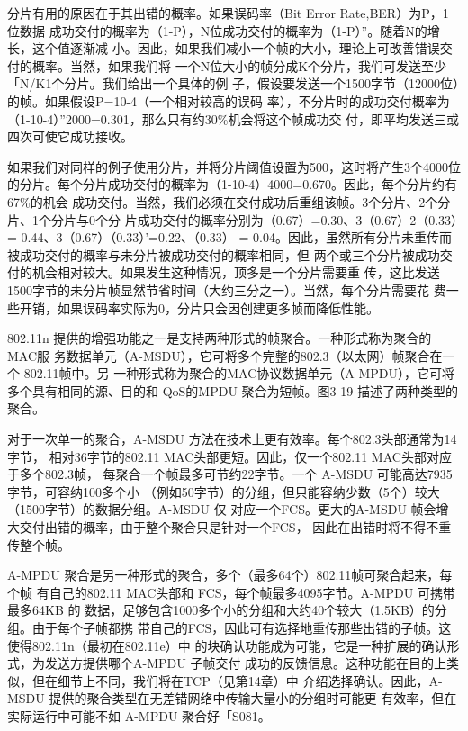 分片有用的原因在于其出错的概率。如果误码率（Bit Error Rate,BER）为P，1 位数据
成功交付的概率为（1-P），N位成功交付的概率为（1-P）”。随着N的增长，这个值逐渐减
小。因此，如果我们减小一个帧的大小，理论上可改善错误交付的概率。当然，如果我们将
一个N位大小的帧分成K个分片，我们可发送至少「N/K1个分片。我们给出一个具体的例
子，假设要发送一个1500字节（12000位）的帧。如果假设P=10-4（一个相对较高的误码
率），不分片时的成功交付概率为（1-10-4）”2000=0.301，那么只有约30\%机会将这个帧成功交
付，即平均发送三或四次可使它成功接收。

如果我们对同样的例子使用分片，并将分片阈值设置为500，这时将产生3个4000位
的分片。每个分片成功交付的概率为（1-10-4）4000=0.670。因此，每个分片约有67\%的机会
成功交付。当然，我们必须在交付成功后重组该帧。3个分片、2个分片、1个分片与0个分
片成功交付的概率分别为（0.67）=0.30、3（0.67）2（0.33）= 0.44、3（0.67）（0.33）’=0.22、（0.33） =
0.04。因此，虽然所有分片未重传而被成功交付的概率与未分片被成功交付的概率相同，但
两个或三个分片被成功交付的机会相对较大。如果发生这种情况，顶多是一个分片需要重
传，这比发送1500字节的未分片帧显然节省时间（大约三分之一）。当然，每个分片需要花
费一些开销，如果误码率实际为0，分片只会因创建更多帧而降低性能。

802.11n 提供的增强功能之一是支持两种形式的帧聚合。一种形式称为聚合的MAC服
务数据单元（A-MSDU），它可将多个完整的802.3（以太网）帧聚合在一个 802.11帧中。另
一种形式称为聚合的MAC协议数据单元（A-MPDU），它可将多个具有相同的源、目的和
QoS的MPDU 聚合为短帧。图3-19 描述了两种类型的聚合。

对于一次单一的聚合，A-MSDU 方法在技术上更有效率。每个802.3头部通常为14字节，
相对36字节的802.11 MAC头部更短。因此，仅一个802.11 MAC头部对应于多个802.3帧，
每聚合一个帧最多可节约22字节。一个 A-MSDU 可能高达7935字节，可容纳100多个小
（例如50字节）的分组，但只能容纳少数（5个）较大（1500字节）的数据分组。A-MSDU 仅
对应一个FCS。更大的A-MSDU 帧会增大交付出错的概率，由于整个聚合只是针对一个FCS，
因此在出错时将不得不重传整个帧。

A-MPDU 聚合是另一种形式的聚合，多个（最多64个）802.11帧可聚合起来，每个帧
有自己的802.11 MAC头部和 FCS，每个帧最多4095字节。A-MPDU 可携带最多64KB 的
数据，足够包含1000多个小的分组和大约40个较大（1.5KB）的分组。由于每个子帧都携
带自己的FCS，因此可有选择地重传那些出错的子帧。这使得802.11n（最初在802.11e）中
的块确认功能成为可能，它是一种扩展的确认形式，为发送方提供哪个A-MPDU 子帧交付
成功的反馈信息。这种功能在目的上类似，但在细节上不同，我们将在TCP（见第14章）中
介绍选择确认。因此，A-MSDU 提供的聚合类型在无差错网络中传输大量小的分组时可能更
有效率，但在实际运行中可能不如 A-MPDU 聚合好「S081。

